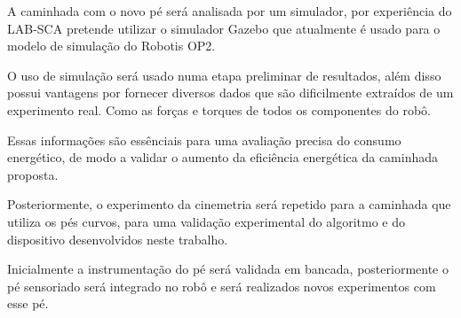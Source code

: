 A caminhada com o novo pé será analisada por um simulador, por experiência do LAB-SCA pretende utilizar o simulador Gazebo que atualmente é usado para o modelo de simulação do Robotis OP2.

O uso de simulação será usado numa etapa preliminar de resultados, além disso possui vantagens por fornecer diversos dados que são dificilmente extraídos de um experimento real. Como as forças e torques de todos os componentes do robô. 

Essas informações são essênciais para uma  avaliação precisa do consumo energético, de modo a validar o aumento da eficiência energética da caminhada proposta.

Posteriormente, o experimento da cinemetria será repetido para a caminhada que utiliza os pés curvos, para uma validação experimental do algoritmo e do dispositivo desenvolvidos neste trabalho.

Inicialmente a instrumentação do pé será validada em bancada, posteriormente o pé sensoriado será integrado no robô e será realizados novos experimentos com esse pé. 


\newpage



\printbibliography
